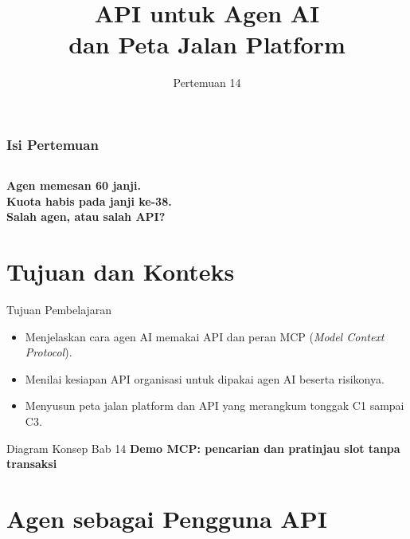\documentclass[aspectratio=169, table, 12pt]{beamer}
\title{\Huge API untuk Agen AI\\ \vspace{10pt} dan Peta Jalan Platform}
\date{Pertemuan 14}
\begin{document}
\frame{\titlepage}

\begin{frame}
  \frametitle{Isi Pertemuan}
  \vspace{14pt}
  \begin{columns}[t]
    {\small\tableofcontents[sections={1-6}]}

    {\small\tableofcontents[sections={7-11}]}
  \end{columns}
\end{frame}

\begin{frame}{\hfill}
  \centering
  \Huge{\textbf{Agen memesan 60 janji.\\Kuota habis pada janji ke-38.\\Salah agen, atau salah API?}}
\end{frame}

\section{Tujuan dan Konteks}

\begin{frame}{{\Large Tujuan Pembelajaran}}
  \vspace{10pt}
  \begin{itemize}
    \item Menjelaskan cara agen AI memakai API dan peran MCP (\textit{Model Context Protocol}).
    \item Menilai kesiapan API organisasi untuk dipakai agen AI beserta risikonya.
    \item Menyusun peta jalan platform dan API yang merangkum tonggak C1 sampai C3.
  \end{itemize}
\end{frame}

\begin{frame}{{\Large Diagram Konsep Bab 14}}
  \centering
  {\small\bfseries Demo MCP: pencarian dan pratinjau slot tanpa transaksi}\par\medskip
\end{frame}

\section{Agen sebagai Pengguna API}
\end{document}
